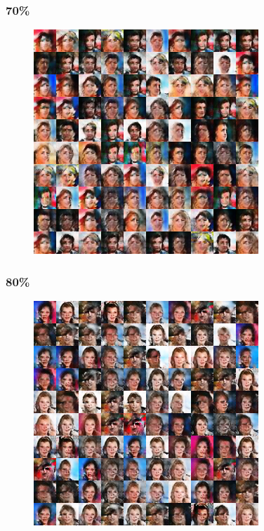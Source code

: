 \documentclass[dvipdfmx,12pt]{beamer}
\begin{document}
\begin{frame}
	\frametitle{70\%}
	\begin{figure}[htbp]
	\begin{center}
	\includegraphics[width=0.7\hsize]{./dcgan/image00070000.png}
	\end{center}
	\end{figure}
\end{frame}
\begin{frame}
	\frametitle{80\%}
	\begin{figure}[htbp]
	\begin{center}
	\includegraphics[width=0.7\hsize]{./dcgan/image00080000.png}
	\end{center}
	\end{figure}
\end{frame}
\end{document}
